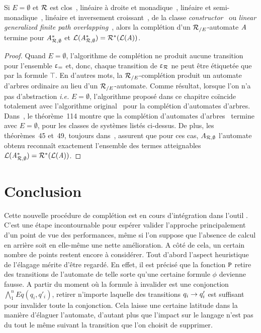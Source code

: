 \begin{theorem}
  \label{thm:regular}
  Si $E=\emptyset$ et $\mathcal R$ est clos~\cite{DauchetTison-LICS90,Brainerd-IC69}, linéaire à droite et
  monadique~\cite{Salomaa88}, linéaire et semi-monadique~\cite{CoquideDauchetGV-FCT89}, linéaire et inversement
  croissant~\cite{Jacquemard-RTA96}, de la classe \emph{constructor}~\cite{Rety-LPAR99} ou \emph{linear generalized finite path
    overlapping~\cite{Takai-RTA04}}, alors la complétion d'un ${\mathcal R_{/E}}$-automate $\mathit A$ 
  termine pour $\mathit A_{\mathcal R,\emptyset}^*$ et $\mathcal{L}(\mathit A_{\mathcal R,\emptyset}^*)=\mathcal R^*(\mathcal{L}(\mathit A))$.
\end{theorem}

\begin{proof}
  Quand $E=\emptyset$, l'algorithme de complétion ne produit aucune transition
  pour l'ensemble $\upvarepsilon_{=}$ et, donc, chaque transition de $\upvarepsilon_{\mathcal R}$ ne peut être étiquetée 
  que par la formule $\top$. En d'autres mots, la ${\mathcal R_{/E}}$-complétion produit un automate d'arbres
  ordinaire au lieu d'un ${\mathcal R_{/E}}$-automate. Comme résultat, lorsque l'on n'a pas d'abstraction \textit{i.e.} $E=\emptyset$,
  l'algorithme proposé dans ce chapitre coïncide totalement avec l'algorithme original~\cite{GenetR-JSC10} 
  pour la complétion d'automates d'arbres. Dans~\cite{Genet-Habil}, le théorème~114 montre que
  la complétion d'automates d'arbres~\cite{GenetR-JSC10} termine avec $E=\emptyset$,
  pour les classes de systèmes listés ci-dessus. De plus, les théorèmes~45 et~49, toujours
  dans~\cite{GenetR-JSC10}, assurent que pour ces cas, $A_{\mathcal R,\emptyset}$ l'automate obtenu
  reconnaît exactement l'ensemble des termes atteignables $\mathcal{L}(\mathit A_{\mathcal R,\emptyset}^*)=\mathcal R^*(\mathcal{L}(\mathit A))$.
\end{proof}

\section{Conclusion}
Cette nouvelle procédure de complétion est en cours d'intégration dans l'outil \timbuk.
C'est une étape incontournable pour espérer valider l'approche principalement d'un point
de vue des performances, même si l'on suppose que l'absence de calcul en arrière soit
en elle-même une nette amélioration. A côté de cela, un certain nombre de points
restent encore à considérer.
Tout d'abord l'aspect heuristique de l'élagage mérite d'être regardé. En effet, 
il est précisé que la fonction $\mathtt{P}$ retire des transitions de l'automate de telle sorte
qu'une certaine formule $\phi$ devienne fausse. A partir du moment où la formule à invalider
est une conjonction $\bigwedge_1^n Eq(q_i,q'_i)$, retirer n'importe laquelle des transitions
$q_i \rightarrow q'_i$ est suffisant pour invalider toute la conjonction. Cela laisse une certaine
latitude dans la manière d'élaguer l'automate, d'autant plus que l'impact sur le langage
n'est pas du tout le même suivant la transition que l'on choisit de supprimer.

